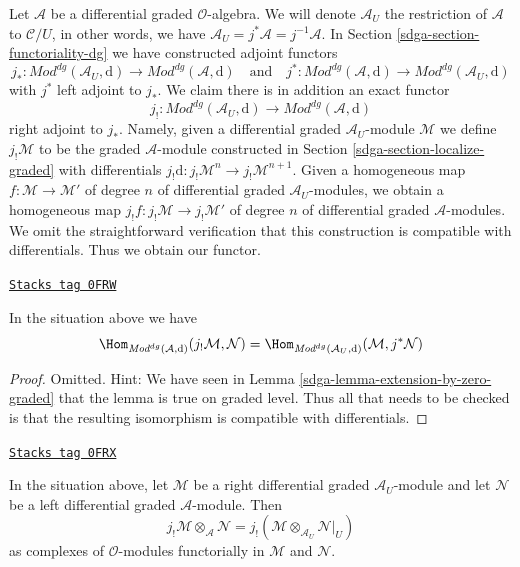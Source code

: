 \medskip\noindent
Let $\mathcal{A}$ be a differential graded $\mathcal{O}$-algebra.
We will denote $\mathcal{A}_U$ the restriction of $\mathcal{A}$
to $\mathcal{C}/U$, in other words, we have
$\mathcal{A}_U = j^*\mathcal{A} = j^{-1}\mathcal{A}$.
In Section \ref{sdga-section-functoriality-dg}
we have constructed adjoint functors
$$
j_* :
\textit{Mod}^{dg}(\mathcal{A}_U, \text{d})
\longrightarrow
\textit{Mod}^{dg}(\mathcal{A}, \text{d})
\quad\text{and}\quad
j^* :
\textit{Mod}^{dg}(\mathcal{A}, \text{d})
\longrightarrow
\textit{Mod}^{dg}(\mathcal{A}_U, \text{d})
$$
with $j^*$ left adjoint to $j_*$. We claim there is in addition an
exact functor
$$
j_! :
\textit{Mod}^{dg}(\mathcal{A}_U, \text{d})
\longrightarrow
\textit{Mod}^{dg}(\mathcal{A}, \text{d})
$$
right adjoint to $j_*$. Namely, given a differential graded
$\mathcal{A}_U$-module $\mathcal{M}$ we define $j_!\mathcal{M}$
to be the graded $\mathcal{A}$-module constructed in
Section \ref{sdga-section-localize-graded}
with differentials
$j_!\text{d} : j_!\mathcal{M}^n \to j_!\mathcal{M}^{n + 1}$.
Given a homogeneous map
$f : \mathcal{M} \to \mathcal{M}'$ of degree $n$ of differential graded
$\mathcal{A}_U$-modules, we obtain a homogeneous map
$j_!f : j_!\mathcal{M} \to j_!\mathcal{M}'$ of degree $n$
of differential graded $\mathcal{A}$-modules. We omit the
straightforward verification
that this construction is compatible with differentials.
Thus we obtain our functor.

\begin{lemma}
\label{sdga-lemma-extension-by-zero-dg}
\href{https://stacks.math.columbia.edu/tag/0FRW}{\texttt{Stacks tag 0FRW}}

In the situation above we have
$$
\Hom_{\textit{Mod}^{dg}(\mathcal{A}, \text{d})}(
j_!\mathcal{M}, \mathcal{N}) =
\Hom_{\textit{Mod}^{dg}(\mathcal{A}_U, \text{d})}(
\mathcal{M}, j^*\mathcal{N})
$$
\end{lemma}

\begin{proof}

Omitted. Hint: We have seen in Lemma \ref{sdga-lemma-extension-by-zero-graded}
that the lemma is true on graded level. Thus all that needs to be
checked is that the resulting isomorphism is compatible with differentials.
\end{proof}

\begin{lemma}
\label{sdga-lemma-tensor-with-extension-by-zero-dg}
\href{https://stacks.math.columbia.edu/tag/0FRX}{\texttt{Stacks tag 0FRX}}

In the situation above, let $\mathcal{M}$ be a right differential graded
$\mathcal{A}_U$-module and let $\mathcal{N}$ be a left differential graded
$\mathcal{A}$-module. Then
$$
j_!\mathcal{M} \otimes_\mathcal{A} \mathcal{N} =
j_!(\mathcal{M} \otimes_{\mathcal{A}_U} \mathcal{N}|_U)
$$
as complexes of $\mathcal{O}$-modules
functorially in $\mathcal{M}$ and $\mathcal{N}$.
\end{lemma}

